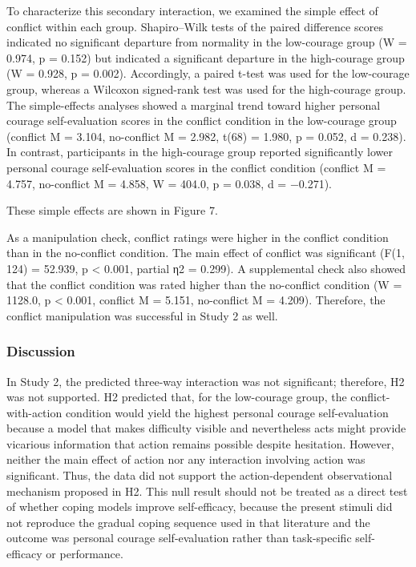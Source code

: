 To characterize this secondary interaction, we examined the simple
effect of conflict within each group. Shapiro--Wilk tests of the paired
difference scores indicated no significant departure from normality in
the low-courage group (W = 0.974, p = 0.152) but indicated a significant
departure in the high-courage group (W = 0.928, p = 0.002). Accordingly,
a paired t-test was used for the low-courage group, whereas a Wilcoxon
signed-rank test was used for the high-courage group. The simple-effects
analyses showed a marginal trend toward higher personal courage
self-evaluation scores in the conflict condition in the low-courage
group (conflict M = 3.104, no-conflict M = 2.982, t(68) = 1.980, p =
0.052, d = 0.238). In contrast, participants in the high-courage group
reported significantly lower personal courage self-evaluation scores in
the conflict condition (conflict M = 4.757, no-conflict M = 4.858, W =
404.0, p = 0.038, d = −0.271).

These simple effects are shown in Figure 7.

As a manipulation check, conflict ratings were higher in the conflict
condition than in the no-conflict condition. The main effect of conflict
was significant (F(1, 124) = 52.939, p \textless{} 0.001, partial η2 =
0.299). A supplemental check also showed that the conflict condition was
rated higher than the no-conflict condition (W = 1128.0, p \textless{}
0.001, conflict M = 5.151, no-conflict M = 4.209). Therefore, the
conflict manipulation was successful in Study 2 as well.

\subsubsection{Discussion}\label{discussion-1}

In Study 2, the predicted three-way interaction was not significant;
therefore, H2 was not supported. H2 predicted that, for the low-courage
group, the conflict-with-action condition would yield the highest
personal courage self-evaluation because a model that makes difficulty
visible and nevertheless acts might provide vicarious information that
action remains possible despite hesitation. However, neither the main
effect of action nor any interaction involving action was significant.
Thus, the data did not support the action-dependent observational
mechanism proposed in H2. This null result should not be treated as a
direct test of whether coping models improve self-efficacy, because the
present stimuli did not reproduce the gradual coping sequence used in
that literature and the outcome was personal courage self-evaluation
rather than task-specific self-efficacy or performance.


